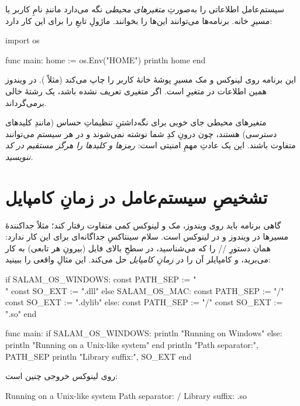 سیستم‌عامل اطلاعاتی را به‌صورتِ \emph{متغیرهای محیطی} نگه می‌دارد مانندِ
نامِ کاربر یا مسیرِ خانه. برنامه‌ها می‌توانند این‌ها را بخوانند. ماژولِ
 تابعِ  را برای این کار دارد:

\begin{salamen}
import os

func main:
    home := os.Env("HOME")
    println home
end
\end{salamen}

این برنامه روی لینوکس و مک مسیرِ پوشهٔ خانهٔ کاربر را چاپ می‌کند (مثلاً
). در ویندوز همین اطلاعات در متغیرِ  است.
اگر متغیری تعریف نشده باشد،  یک رشتهٔ خالی برمی‌گرداند.

\begin{tip}
متغیرهای محیطی جای خوبی برای نگه‌داشتنِ تنظیماتِ حساس (مانندِ کلیدهای دسترسی)
هستند، چون درونِ کدِ شما نوشته نمی‌شوند و در هر سیستم می‌توانند متفاوت باشند.
این یک عادتِ مهمِ امنیتی است: \emph{رمزها و کلیدها را هرگز مستقیم در کد ننویسید.}
\end{tip}

\section{تشخیصِ سیستم‌عامل در زمانِ کامپایل}

گاهی برنامه باید روی ویندوز، مک و لینوکس کمی متفاوت رفتار کند؛ مثلاً
جداکنندهٔ مسیرها در ویندوز \code{\textbackslash} و در لینوکس \code{/} است. سلام
سینتاکسِ جداگانه‌ای برای این کار ندارد: همان دستورِ //
 را که می‌شناسید، در سطحِ بالای فایل (بیرونِ هر تابعی) به کار
می‌برید، و کامپایلر آن را در \emph{زمانِ کامپایل} حل می‌کند. این مثالِ واقعی را
ببینید:

\begin{salamen}
if SALAM_OS_WINDOWS:
    const PATH_SEP := "\\"
    const SO_EXT := ".dll"
else SALAM_OS_MAC:
    const PATH_SEP := "/"
    const SO_EXT := ".dylib"
else:
    const PATH_SEP := "/"
    const SO_EXT := ".so"
end

func main:
    if SALAM_OS_WINDOWS:
        println "Running on Windows"
    else:
        println "Running on a Unix-like system"
    end
    println "Path separator:", PATH_SEP
    println "Library suffix:", SO_EXT
end
\end{salamen}

روی لینوکس خروجی چنین است:

\begin{progout}
Running on a Unix-like system
Path separator: /
Library suffix: .so
\end{progout}

